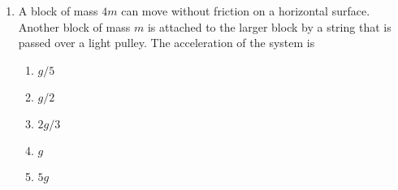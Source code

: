 \documentclass{../../../oss-classkick}
\begin{document}
\begin{multicols*}{2}
\begin{enumerate}[resume,leftmargin=18pt]
    
  \item A block of mass $4m$ can move without friction on a horizontal surface.
    Another block of mass $m$ is attached to the larger block by a string that
    is passed over a light pulley. The acceleration of the system is

    \vspace{-.1in}
    \begin{enumerate}[nosep,leftmargin=18pt,label=(\Alph*)]
    \item $g/5$
    \item $g/2$
    \item $2g/3$
    \item $g$
    \item $5g$
    \end{enumerate}

    \columnbreak
    

\end{enumerate}
\end{multicols*}
\end{document}
